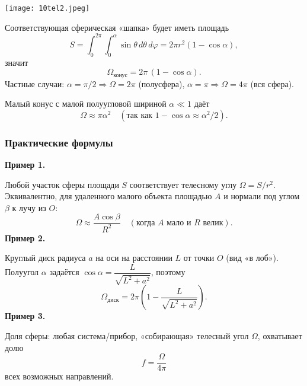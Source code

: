 \documentclass[12pt, a4paper]{article}%
\begin{document}
\begin{center}
\texttt{[image: 10tel2.jpeg]}
\label{fig:mpr}
\end{center}

Соответствующая сферическая «шапка» будет иметь площадь \[S=\int_{0}^{2\pi}\!\!\int_{0}^{\alpha}\sin\theta\,d\theta\,d\varphi = 2\pi r^2(1-\cos\alpha),\] значит
\[
\Omega_{\text{конус}}=2\pi\,(1-\cos\alpha).
\]
Частные случаи: $\alpha=\pi/2\Rightarrow \Omega=2\pi$ (полусфера), $\alpha=\pi\Rightarrow \Omega=4\pi$ (вся сфера).

Малый конус с малой полуугловой шириной $\alpha\ll1$ даёт
\[
\Omega\approx \pi\alpha^2 \quad (\text{так как }1-\cos\alpha\approx \alpha^2/2).
\]


\subsubsection*{Практические формулы}
\textbf{Пример 1.}

 Любой участок сферы площади $S$ соответствует телесному углу $\Omega=S/r^2$. Эквивалентно, для удаленного малого объекта площадью $A$ и нормали под углом $\beta$ к лучу из $O$:
\[
\Omega\approx \frac{A\cos\beta}{R^2}\quad (\text{когда }A\text{ мало и }R\text{ велик}).
\]
\textbf{Пример 2.}

Круглый диск радиуса $a$ на оси на расстоянии $L$ от точки $O$ (вид «в лоб»). Полуугол $\alpha$ задаётся $\cos\alpha=\dfrac{L}{\sqrt{L^2+a^2}}$, поэтому
\[
\Omega_{\text{диск}}=2\pi\!\left(1-\frac{L}{\sqrt{L^2+a^2}}\right).
\]
\textbf{Пример 3.} 

Доля сферы: любая система/прибор, «собирающая» телесный угол $\Omega$, охватывает долю
\[
f=\frac{\Omega}{4\pi}
\]
всех возможных направлений.
\end{document}
